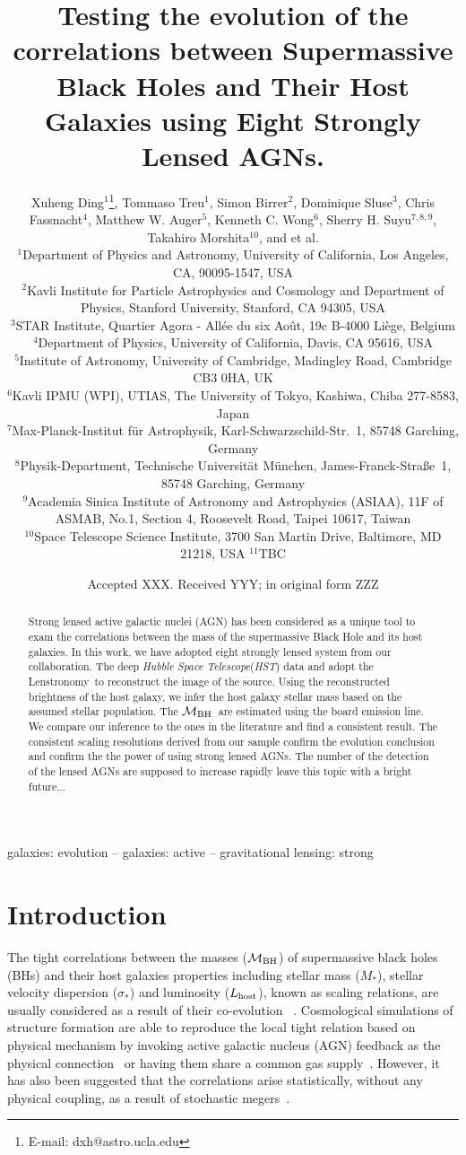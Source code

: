 \documentclass[fleqn,usenatbib]{mnras}
\title[Mass relations by lensed AGN hosts]{Testing the evolution of the correlations between Supermassive Black Holes and Their Host Galaxies using Eight Strongly Lensed AGNs.}
\author[X. Ding et al.]{
Xuheng Ding$^{1}$\thanks{E-mail: dxh@astro.ucla.edu},
Tommaso Treu$^{1}$,
Simon Birrer$^{2}$,
Dominique Sluse$^{3}$,\newauthor
Chris Fassnacht$^{4}$,
Matthew W. Auger$^{5}$,
Kenneth C. Wong$^{6}$,
Sherry H. Suyu$^{7,8,9}$,\newauthor
Takahiro Morshita$^{10}$,
and et al.
\\
$^{1}$Department of Physics and Astronomy, University of California, Los Angeles, CA, 90095-1547, USA\\
$^{2}$Kavli Institute for Particle Astrophysics and Cosmology and Department of Physics, Stanford University, Stanford, CA 94305, USA\\
$^{3}$STAR Institute, Quartier Agora - All\'ee du six Ao\^ut, 19c B-4000 Li\`ege, Belgium\\
$^{4}$Department of Physics, University of California, Davis, CA 95616, USA\\
$^{5}$Institute of Astronomy, University of Cambridge, Madingley Road, Cambridge CB3 0HA, UK\\
$^{6}$Kavli IPMU (WPI), UTIAS, The University of Tokyo, Kashiwa, Chiba 277-8583, Japan\\
$^{7}$Max-Planck-Institut f{\"u}r Astrophysik, Karl-Schwarzschild-Str.~1, 85748 Garching, Germany\\
$^{8}$Physik-Department, Technische Universit\"at M\"unchen, James-Franck-Stra\ss{}e~1, 85748 Garching, Germany\\
$^{9}$Academia Sinica Institute of Astronomy and Astrophysics (ASIAA), 11F of ASMAB, No.1, Section 4, Roosevelt Road, Taipei 10617, Taiwan\\
$^{10}$Space Telescope Science Institute, 3700 San Martin Drive, Baltimore, MD 21218, USA
$^{11}$TBC
}
\date{Accepted XXX. Received YYY; in original form ZZZ}
\newcommand{\hst}{{\it HST}}
\newcommand{\mbh}{$\mathcal M_{\rm BH}$}
\newcommand{\lhost}{$L_{\rm host}$}
\newcommand{\lenstronomy}{{\sc Lenstronomy}}
\newcommand{\mstar}{{$M_*$}}
\begin{document}
\label{firstpage}
\pagerange{\pageref{firstpage}--\pageref{lastpage}}
\maketitle

\begin{abstract}
Strong lensed active galactic nuclei (AGN) has been considered as a unique tool to exam the correlations between the mass of the supermassive Black Hole and its host galaxies. In this work, we have adopted eight strongly lensed system from our collaboration. The deep {\it Hubble Space Telescope}(\hst) data and adopt the \lenstronomy\ to reconstruct the image of the source. Using the reconstructed brightness of the host galaxy, we infer the host galaxy stellar mass based on the assumed stellar population. 
The \mbh\ are estimated using the board emission line. We compare our inference to the ones in the literature and find a consistent result. The consistent scaling resolutions derived from our sample confirm the evolution conclusion and confirm the the power of using strong lensed AGNs. The number of the detection of the lensed AGNs are supposed to increase rapidly leave this topic with a bright future...
\end{abstract}

\begin{keywords}
galaxies: evolution -- galaxies: active -- gravitational lensing: strong
\end{keywords}


\section{Introduction}
The tight correlations between the masses (\mbh) of supermassive black holes (BHs) and their host galaxies properties including stellar mass (\mstar), stellar velocity dispersion ($\sigma_*$) and luminosity (\lhost), known as scaling relations, are usually considered as a result of their co-evolution ~\citep[e.g.,][]{Mag++98, F+M00, Geb++01b, M+H03, Gul++09,Beifi2012, H+R04, Gra++2011}. Cosmological simulations of structure formation are able to reproduce the local tight relation based on physical mechanism by invoking active galactic nucleus (AGN) feedback as the physical connection~\citep{Springel2005, Hopkins2008, Matteo2008, DeG++15} or having them share a common gas supply~\citep{Cen2015, Menci2016}. However, it has also been suggested that the correlations arise statistically, without any physical coupling, as a result of stochastic megers~\citep{Peng2007, Jahnke2011, Hirschmann2010}. 
\end{document}
